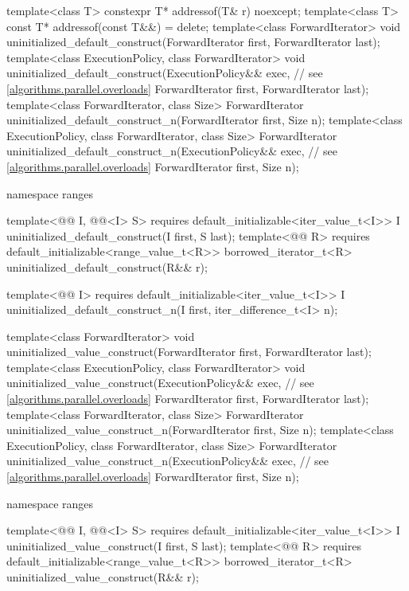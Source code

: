 \begin{codeblock}
{  template<class T>
    constexpr T* addressof(T& r) noexcept;
  template<class T>
    const T* addressof(const T&&) = delete;
  template<class ForwardIterator>
    void uninitialized_default_construct(ForwardIterator first, ForwardIterator last);
  template<class ExecutionPolicy, class ForwardIterator>
    void uninitialized_default_construct(ExecutionPolicy&& exec,        // see \ref{algorithms.parallel.overloads}
                                         ForwardIterator first, ForwardIterator last);
  template<class ForwardIterator, class Size>
    ForwardIterator uninitialized_default_construct_n(ForwardIterator first, Size n);
  template<class ExecutionPolicy, class ForwardIterator, class Size>
    ForwardIterator uninitialized_default_construct_n(ExecutionPolicy&& exec,   // see \ref{algorithms.parallel.overloads}
                                                      ForwardIterator first, Size n);

  namespace ranges {
    template<@@ I, @@<I> S>
      requires default_initializable<iter_value_t<I>>
        I uninitialized_default_construct(I first, S last);
    template<@@ R>
      requires default_initializable<range_value_t<R>>
        borrowed_iterator_t<R> uninitialized_default_construct(R&& r);

    template<@@ I>
      requires default_initializable<iter_value_t<I>>
        I uninitialized_default_construct_n(I first, iter_difference_t<I> n);
  }

  template<class ForwardIterator>
    void uninitialized_value_construct(ForwardIterator first, ForwardIterator last);
  template<class ExecutionPolicy, class ForwardIterator>
    void uninitialized_value_construct(ExecutionPolicy&& exec,  // see \ref{algorithms.parallel.overloads}
                                       ForwardIterator first, ForwardIterator last);
  template<class ForwardIterator, class Size>
    ForwardIterator uninitialized_value_construct_n(ForwardIterator first, Size n);
  template<class ExecutionPolicy, class ForwardIterator, class Size>
    ForwardIterator uninitialized_value_construct_n(ExecutionPolicy&& exec, // see \ref{algorithms.parallel.overloads}
                                                    ForwardIterator first, Size n);

  namespace ranges {
    template<@@ I, @@<I> S>
      requires default_initializable<iter_value_t<I>>
        I uninitialized_value_construct(I first, S last);
    template<@@ R>
      requires default_initializable<range_value_t<R>>
        borrowed_iterator_t<R> uninitialized_value_construct(R&& r);

}}
\end{codeblock}
